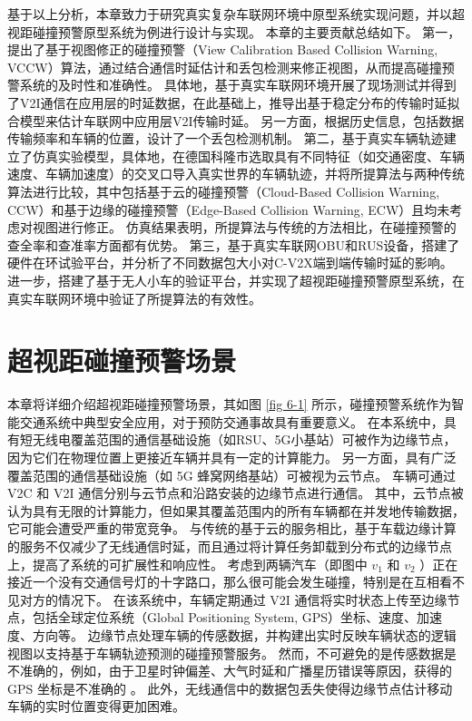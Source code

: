 基于以上分析，本章致力于研究真实复杂车联网环境中原型系统实现问题，并以超视距碰撞预警原型系统为例进行设计与实现。
本章的主要贡献总结如下。
第一，提出了基于视图修正的碰撞预警（View Calibration Based Collision Warning, VCCW）算法，通过结合通信时延估计和丢包检测来修正视图，从而提高碰撞预警系统的及时性和准确性。
具体地，基于真实车联网环境开展了现场测试并得到了V2I通信在应用层的时延数据，在此基础上，推导出基于稳定分布的传输时延拟合模型来估计车联网中应用层V2I传输时延。
另一方面，根据历史信息，包括数据传输频率和车辆的位置，设计了一个丢包检测机制。
第二，基于真实车辆轨迹建立了仿真实验模型，具体地，在德国科隆市选取具有不同特征（如交通密度、车辆速度、车辆加速度）的交叉口导入真实世界的车辆轨迹，并将所提算法与两种传统算法进行比较，其中包括基于云的碰撞预警（Cloud-Based Collision Warning, CCW）和基于边缘的碰撞预警（Edge-Based Collision Warning, ECW）且均未考虑对视图进行修正。
仿真结果表明，所提算法与传统的方法相比，在碰撞预警的查全率和查准率方面都有优势。
第三，基于真实车联网OBU和RUS设备，搭建了硬件在环试验平台，并分析了不同数据包大小对C-V2X端到端传输时延的影响。
进一步，搭建了基于无人小车的验证平台，并实现了超视距碰撞预警原型系统，在真实车联网环境中验证了所提算法的有效性。


\section{超视距碰撞预警场景}\label{section 6-2}

本章将详细介绍超视距碰撞预警场景，其如图 \ref{fig 6-1} 所示，碰撞预警系统作为智能交通系统中典型安全应用，对于预防交通事故具有重要意义。
在本系统中，具有短无线电覆盖范围的通信基础设施（如RSU、5G小基站）可被作为边缘节点，因为它们在物理位置上更接近车辆并具有一定的计算能力。
另一方面，具有广泛覆盖范围的通信基础设施（如 5G 蜂窝网络基站）可被视为云节点。
车辆可通过 V2C 和 V2I 通信分别与云节点和沿路安装的边缘节点进行通信。
其中，云节点被认为具有无限的计算能力，但如果其覆盖范围内的所有车辆都在并发地传输数据，它可能会遭受严重的带宽竞争。 
与传统的基于云的服务相比，基于车载边缘计算的服务不仅减少了无线通信时延，而且通过将计算任务卸载到分布式的边缘节点上，提高了系统的可扩展性和响应性。
考虑到两辆汽车（即图中 $v_1$ 和 $v_2$ ）正在接近一个没有交通信号灯的十字路口，那么很可能会发生碰撞，特别是在互相看不见对方的情况下。
在该系统中，车辆定期通过 V2I 通信将实时状态上传至边缘节点，包括全球定位系统（Global Positioning System, GPS）坐标、速度、加速度、方向等。
边缘节点处理车辆的传感数据，并构建出实时反映车辆状态的逻辑视图以支持基于车辆轨迹预测的碰撞预警服务。
然而，不可避免的是传感数据是不准确的，例如，由于卫星时钟偏差、大气时延和广播星历错误等原因，获得的 GPS 坐标是不准确的 \cite{liu2013improving}。
此外，无线通信中的数据包丢失使得边缘节点估计移动车辆的实时位置变得更加困难。

